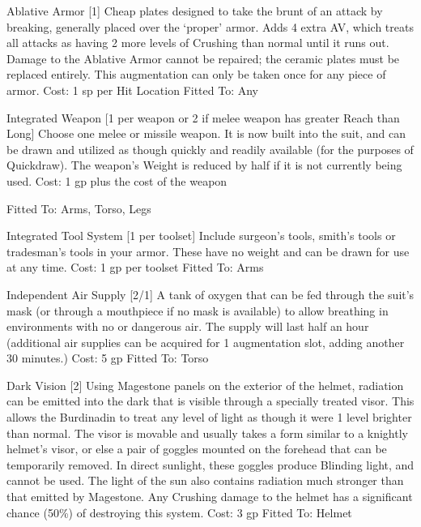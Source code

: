 \documentclass[oneside,11pt,english]{book}
\begin{document}
 

Ablative Armor [1] 
Cheap plates designed to take the brunt of an attack by breaking, generally placed over the ‘proper’ 
armor. Adds 4 extra AV, which treats all attacks as having 2 more levels of Crushing than normal until it 
runs out. Damage to the Ablative Armor cannot be repaired; the ceramic plates must be replaced entirely. 
This augmentation can only be taken once for any piece of armor. 
Cost: 1 sp per Hit Location 
Fitted To: Any 

 

Integrated Weapon [1 per weapon or 2 if melee weapon has greater Reach than Long] 
Choose one melee or missile weapon. It is now built into the suit, and can be drawn and utilized as though 
quickly and readily available (for the purposes of Quickdraw). The weapon’s Weight is reduced by half if 
it is not currently being used. 
Cost: 1 gp plus the cost of the weapon 


Fitted To: Arms, Torso, Legs 

 

Integrated Tool System [1 per toolset] 
Include surgeon’s tools, smith’s tools or tradesman’s tools in your armor. These have no weight and can 
be drawn for use at any time. 
Cost: 1 gp per toolset 
Fitted To: Arms 

 

Independent Air Supply [2/1] 
A tank of oxygen that can be fed through the suit’s mask (or through a mouthpiece if no mask is 
available) to allow breathing in environments with no or dangerous air. The supply will last half an hour 
(additional air supplies can be acquired for 1 augmentation slot, adding another 30 minutes.) 
Cost: 5 gp 
Fitted To: Torso 

 

Dark Vision [2] 
Using Magestone panels on the exterior of the helmet, radiation can be emitted into the dark that is visible 
through a specially treated visor. This allows the Burdinadin to treat any level of light as though it were 1 
level brighter than normal. The visor is movable and usually takes a form similar to a knightly helmet’s 
visor, or else a pair of goggles mounted on the forehead that can be temporarily removed. In direct 
sunlight, these goggles produce Blinding light, and cannot be used. The light of the sun also contains 
radiation much stronger than that emitted by Magestone. Any Crushing damage to the helmet has a 
significant chance (50\%) of destroying this system. 
Cost: 3 gp 
Fitted To: Helmet 
\end{document}
